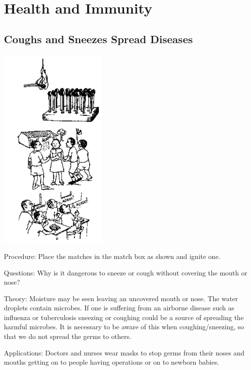 \section{Health and Immunity}

\begin{multicols}{2}


\subsection{Coughs and Sneezes Spread Diseases} %

\begin{center}
\includegraphics[width=0.4\textwidth]{./img/source/coughs.png}
\end{center}

\begin{description*}
\item[Procedure:]{Place the matches in the match box as shown and ignite one.}
\item[Questions:]{Why is it dangerous to sneeze or cough without covering the mouth or nose?}
\item[Theory:]{Moisture may be seen leaving an uncovered mouth or nose. The water droplets contain
microbes. If one is suffering from an airborne disease such as influenza or tuberculosis
sneezing or coughing could be a source of spreading the harmful microbes. It is necessary to
be aware of this when coughing/sneezing, so that we do not spread the germs to others.
}
\item[Applications:]{Doctors and nurses wear masks to stop germs from their noses and mouths getting on to
people having operations or on to newborn babies.}
\end{description*}


\end{multicols}
